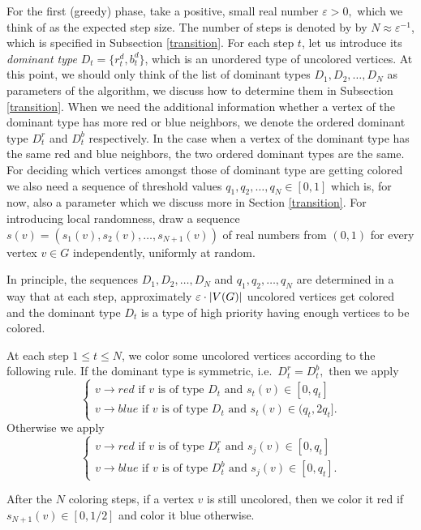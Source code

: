 \documentclass{article}
\theoremstyle{definition}
\newcommand{\eps}{\varepsilon}
\DeclarePairedDelimiter\abs{\lvert}{\rvert}
\begin{document}
For the first (greedy) phase, take a positive, small real number $\eps>0,$ which we think of as the expected step size. 
 The number of steps is denoted by by $N\approx\eps^{-1}$, which is specified in Subsection \ref{transition}.
For each step $t$, let us introduce its \emph{dominant type} $D_t=\{r^d_t,b^d_t\}$, which is an unordered type of uncolored vertices.
At this point, we should only think of the list of dominant types $D_1,D_2,\ldots,D_{N}$ as parameters of the algorithm, we discuss how to determine them in Subsection \ref{transition}.
When we need the additional information whether a vertex of the dominant type has more red or blue neighbors, we denote the ordered dominant type $D_t^r$ and $D_t^b$ respectively. In the case when a vertex of the dominant type has the same red and blue neighbors, the two ordered dominant types are the same.
 For deciding which vertices amongst those of dominant type are getting colored we also need a sequence of threshold values $q_1,q_2,\ldots,q_N\in[0,1]$ which is, for now, also a parameter which we discuss more in Section \ref{transition}. For introducing local randomness, draw a sequence $s(v)=(s_1(v),s_2(v),\ldots,s_{N+1}(v))$ of real numbers from $(0,1)$ for every vertex $v\in G$ independently, uniformly at random.

In principle, the sequences $D_1,D_2,\ldots,D_N$ and $q_1,q_2,\ldots,q_N$ are determined in a way that at each step, approximately $\eps\cdot \abs{V(G)}$ uncolored vertices get colored and the dominant type $D_t$ is a type of high priority having enough vertices to be colored.

At each step $1\leq t\leq N$, we color some uncolored vertices according to the following rule. If the dominant type is symmetric, i.e.\ $D_t^r=D_t^b,$ then we apply
$$
\begin{cases}
v\to red  \text{ if } v \text{ is of type } D_t \text{ and } s_t(v)\in [0,q_t]\\
v\to blue \text{ if } v \text{ is of type } D_t \text{ and } s_t(v)\in (q_t,2q_t].
\end{cases}
$$
Otherwise we apply
$$
\begin{cases}
v\to red  \text{ if } v \text{ is of type } D_t^r \text{ and } s_j(v)\in [0,q_t]\\
v\to blue \text{ if } v \text{ is of type } D_t^b \text{ and } s_j(v)\in [0,q_t].
\end{cases}
$$

After the $N$ coloring steps, if a vertex $v$ is still uncolored, then we color it red if $s_{N+1}(v)\in[0,1/2]$ and color it blue otherwise.
\end{document}
